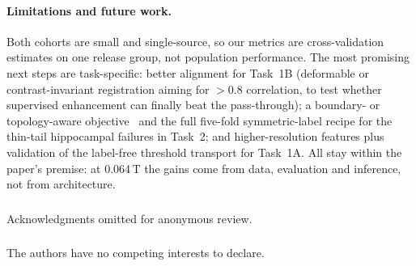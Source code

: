 \documentclass[runningheads]{llncs}
\begin{document}
\paragraph{Limitations and future work.}
Both cohorts are small and single-source, so our metrics are cross-validation
estimates on one release group, not population performance. The most promising
next steps are task-specific: better alignment for Task~1B (deformable or
contrast-invariant registration aiming for $>0.8$ correlation, to test whether
supervised enhancement can finally beat the pass-through); a boundary- or
topology-aware objective~\cite{kervadec2021boundary} and the full five-fold
symmetric-label recipe for the thin-tail hippocampal failures in Task~2; and
higher-resolution features plus validation of the label-free threshold transport
for Task~1A. All stay within the paper's premise: at 0.064\,T the gains come from
data, evaluation and inference, not from architecture.

\begin{credits}
\subsubsection{\ackname}
Acknowledgments omitted for anonymous review.
\subsubsection{\discintname}
The authors have no competing interests to declare.
\end{credits}
\end{document}
